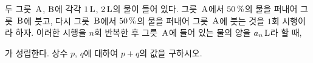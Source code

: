 \hspace*{2mm}\begin{minipage}[t]{\dimexpr\linewidth-2mm\relax}\vspace{0pt}
두 그릇~$\mathrm{A}$, $\mathrm{B}$에 각각 $1\mkern3mu \mathrm{L}$, $2\mkern3mu \mathrm{L}$의 물이 들어 있다. 그릇~$\mathrm{A}$에서 $50\mkern3mu \%$의 물을 퍼내어 그릇~$\mathrm{B}$에 붓고, 다시 그릇~$\mathrm{B}$에서 $50\mkern3mu \%$의 물을 퍼내어 그릇~$\mathrm{A}$에 붓는 것을 $1$회 시행이라 하자. 이러한 시행을 $n$회 반복한 후 그릇~$\mathrm{A}$에 들어 있는 물의 양을 $a_n\mkern3mu \mathrm{L}$라 할 때, \par\smallskip{}\par\smallskip\noindent 가 성립한다. 상수 $p$, $q$에 대하여 $p+q$의 값을 구하시오.\end{minipage}
